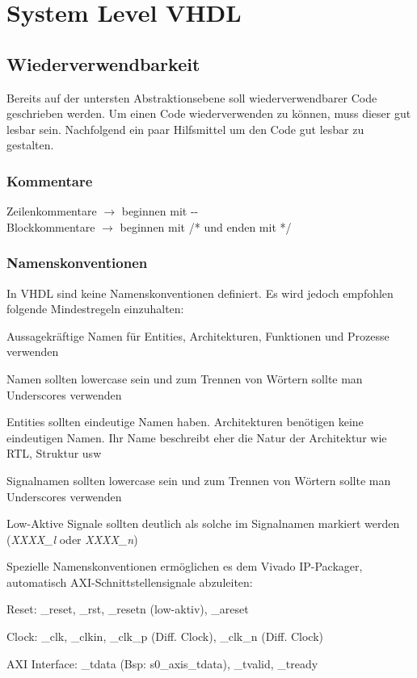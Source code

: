 \section{System Level VHDL}
\subsection{Wiederverwendbarkeit}$~$ \\
Bereits auf der untersten Abstraktionsebene soll wiederverwendbarer Code geschrieben werden. Um einen Code wiederverwenden zu können, muss dieser gut lesbar sein. Nachfolgend ein paar Hilfsmittel um den Code gut lesbar zu gestalten.
\subsubsection{Kommentare}
Zeilenkommentare $\rightarrow$ beginnen mit -{}-\\
Blockkommentare $\rightarrow$ beginnen mit /* und enden mit */
\subsubsection{Namenskonventionen}
In VHDL sind keine Namenskonventionen definiert. Es wird jedoch empfohlen folgende Mindestregeln einzuhalten:
\begin{compactitem}
    \item Aussagekräftige Namen für Entities, Architekturen, Funktionen und Prozesse verwenden
    \item Namen sollten lowercase sein und zum Trennen von Wörtern sollte man Underscores verwenden
    \item Entities sollten eindeutige Namen haben. Architekturen benötigen keine eindeutigen Namen. Ihr Name beschreibt eher die Natur der Architektur wie RTL, Struktur usw
    \item Signalnamen sollten lowercase sein und zum Trennen von Wörtern sollte man Underscores verwenden
    \item Low-Aktive Signale sollten deutlich als solche im Signalnamen markiert werden (\textit{XXXX\_l} oder \textit{XXXX\_n})
\end{compactitem}
Spezielle Namenskonventionen ermöglichen es dem Vivado IP-Packager, automatisch AXI-Schnittstellensignale abzuleiten:
\begin{compactitem}
    \item Reset: \_reset, \_rst, \_resetn (low-aktiv), \_areset
    \item Clock: \_clk, \_clkin, \_clk\_p (Diff. Clock), \_clk\_n (Diff. Clock)
    \item AXI Interface: \_tdata (Bsp: s0\_axis\_tdata), \_tvalid, \_tready
\end{compactitem}
